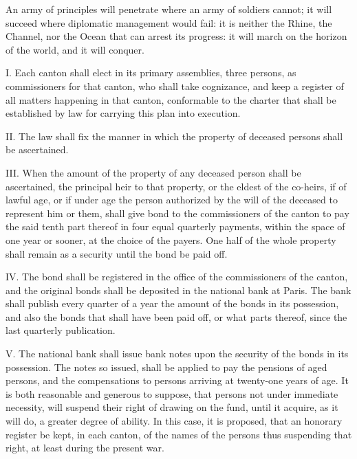 An army of principles will penetrate where an army of soldiers cannot; it will succeed where diplomatic management would fail: it is neither the Rhine, the Channel, nor the Ocean that can arrest its progress: it will march on the horizon of the world, and it will conquer.\par


I. Each canton shall elect in its primary assemblies, three persons, as commissioners for that canton, who shall take cognizance, and keep a register of all matters happening in that canton, conformable to the charter that shall be established by law for carrying this plan into execution.\par

II. The law shall fix the manner in which the property of deceased persons shall be ascertained.\par

III. When the amount of the property of any deceased person shall be ascertained, the principal heir to that property, or the eldest of the co-heirs, if of lawful age, or if under age the person authorized by the will of the deceased to represent him or them, shall give bond to the commissioners of the canton to pay the said tenth part thereof in four equal quarterly payments, within the space of one year or sooner, at the choice of the payers. One half of the whole property shall remain as a security until the bond be paid off.\par

IV. The bond shall be registered in the office of the commissioners of the canton, and the original bonds shall be deposited in the national bank at Paris. The bank shall publish every quarter of a year the amount of the bonds in its possession, and also the bonds that shall have been paid off, or what parts thereof, since the last quarterly publication.\par

V. The national bank shall issue bank notes upon the security of the bonds in its possession. The notes so issued, shall be applied to pay the pensions of aged persons, and the compensations to persons arriving at twenty-one years of age. It is both reasonable and generous to suppose, that persons not under immediate necessity, will suspend their right of drawing on the fund, until it acquire, as it will do, a greater degree of ability. In this case, it is proposed, that an honorary register be kept, in each canton, of the names of the persons thus suspending that right, at least during the present war.\par

